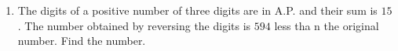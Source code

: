 \documentclass{article}
\begin{document}
   
	\begin{enumerate}
	\item The digits of a positive number of three digits are in A.P. and their sum is $15$. The number obtained by reversing the digits is $594$ less tha    n the original number. Find the number.
	\end{enumerate}
	  
\end{document}
